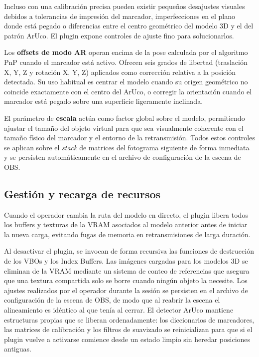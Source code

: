 Incluso con una calibración precisa pueden existir pequeños desajustes visuales debidos a tolerancias de impresión del marcador, imperfecciones en el plano donde está pegado o diferencias entre el centro geométrico del modelo 3D y el del patrón ArUco. El plugin expone controles de ajuste fino para solucionarlos.

Los \textbf{offsets de modo AR} operan encima de la pose calculada por el algoritmo PnP cuando el marcador está activo. Ofrecen seis grados de libertad (traslación X, Y, Z y rotación X, Y, Z) aplicados como corrección relativa a la posición detectada. Su uso habitual es centrar el modelo cuando su origen geométrico no coincide exactamente con el centro del ArUco, o corregir la orientación cuando el marcador está pegado sobre una superficie ligeramente inclinada.

El parámetro de \textbf{escala} actúa como factor global sobre el modelo, permitiendo ajustar el tamaño del objeto virtual para que sea visualmente coherente con el tamaño físico del marcador y el entorno de la retransmisión. Todos estos controles se aplican sobre el \textit{stack} de matrices del fotograma siguiente de forma inmediata y se persisten automáticamente en el archivo de configuración de la escena de OBS.

\subsection{Gestión y recarga de recursos}
\label{subsec:gestion_recursos}

Cuando el operador cambia la ruta del modelo en directo, el plugin libera todos los buffers y texturas de la VRAM asociados al modelo anterior antes de iniciar la nueva carga, evitando fugas de memoria en retransmisiones de larga duración.

Al desactivar el plugin, se invocan de forma recursiva las funciones de destrucción de los VBOs y los Index Buffers. Las imágenes cargadas para los modelos 3D se eliminan de la VRAM mediante un sistema de conteo de referencias que asegura que una textura compartida solo se borre cuando ningún objeto la necesite. Los ajustes realizados por el operador durante la sesión se persisten en el archivo de configuración de la escena de OBS, de modo que al reabrir la escena el alineamiento es idéntico al que tenía al cerrar. El detector ArUco mantiene estructuras propias que se liberan ordenadamente: los diccionarios de marcadores, las matrices de calibración y los filtros de suavizado se reinicializan para que si el plugin vuelve a activarse comience desde un estado limpio sin heredar posiciones antiguas.

